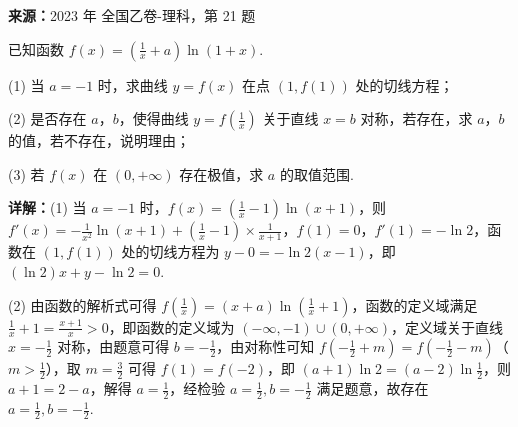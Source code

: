 \begin{question}[points=12]
\textbf{来源：}2023 年 全国乙卷-理科，第 21 题\par
已知函数 $f(x)=(\frac{1}{x}+a)\ln(1+x)$.



(1) 当 $a=-1$ 时，求曲线 $y=f(x)$ 在点 $(1,f(1))$ 处的切线方程；



(2) 是否存在 $a$，$b$，使得曲线 $y=f(\frac{1}{x})$ 关于直线 $x=b$ 对称，若存在，求 $a$，$b$ 的值，若不存在，说明理由；



(3) 若 $f(x)$ 在 $(0,+\infty)$ 存在极值，求 $a$ 的取值范围.
\begin{solution}

\textbf{详解：}(1) 当 $a=-1$ 时，$f(x)=(\frac{1}{x}-1)\ln(x+1)$，则 $f'(x)=-\frac{1}{x^2}\ln(x+1)+(\frac{1}{x}-1)\times\frac{1}{x+1}$，$f(1)=0$，$f'(1)=-\ln2$，函数在 $(1,f(1))$ 处的切线方程为 $y-0=-\ln2(x-1)$，即 $(\ln2)x+y-\ln2=0$.

(2) 由函数的解析式可得 $f(\frac{1}{x})=(x+a)\ln(\frac{1}{x}+1)$，函数的定义域满足 $\frac{1}{x}+1=\frac{x+1}{x}>0$，即函数的定义域为 $(-\infty,-1)\cup(0,+\infty)$，定义域关于直线 $x=-\frac{1}{2}$ 对称，由题意可得 $b=-\frac{1}{2}$，由对称性可知 $f(-\frac{1}{2}+m)=f(-\frac{1}{2}-m)$（$m>\frac{1}{2}$），取 $m=\frac{3}{2}$ 可得 $f(1)=f(-2)$，即 $(a+1)\ln2=(a-2)\ln\frac{1}{2}$，则 $a+1=2-a$，解得 $a=\frac{1}{2}$，经检验 $a=\frac{1}{2},b=-\frac{1}{2}$ 满足题意，故存在 $a=\frac{1}{2},b=-\frac{1}{2}$.


\end{solution}
\end{question}
